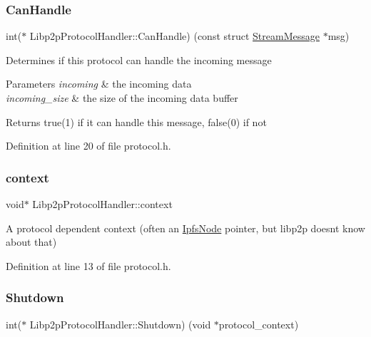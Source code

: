 \subsubsection{\texorpdfstring{Can\+Handle}{CanHandle}}
{\footnotesize\ttfamily int($\ast$ Libp2p\+Protocol\+Handler\+::\+Can\+Handle) (const struct \mbox{\hyperlink{struct_stream_message}{Stream\+Message}} $\ast$msg)}

Determines if this protocol can handle the incoming message 
\begin{DoxyParams}{Parameters}
{\em incoming} & the incoming data \\
\hline
{\em incoming\+\_\+size} & the size of the incoming data buffer \\
\hline
\end{DoxyParams}
\begin{DoxyReturn}{Returns}
true(1) if it can handle this message, false(0) if not 
\end{DoxyReturn}


Definition at line 20 of file protocol.\+h.

\mbox{\label{struct_libp2p_protocol_handler_a95a6ff6efff9baf5c09bbd00f895f9e2}} 
\subsubsection{\texorpdfstring{context}{context}}
{\footnotesize\ttfamily void$\ast$ Libp2p\+Protocol\+Handler\+::context}

A protocol dependent context (often an \mbox{\hyperlink{struct_ipfs_node}{Ipfs\+Node}} pointer, but libp2p doesn\textquotesingle{}t know about that) 

Definition at line 13 of file protocol.\+h.

\mbox{\label{struct_libp2p_protocol_handler_a99321f59de18af32c0332bd8b37afd83}} 
\subsubsection{\texorpdfstring{Shutdown}{Shutdown}}
{\footnotesize\ttfamily int($\ast$ Libp2p\+Protocol\+Handler\+::\+Shutdown) (void $\ast$protocol\+\_\+context)}

